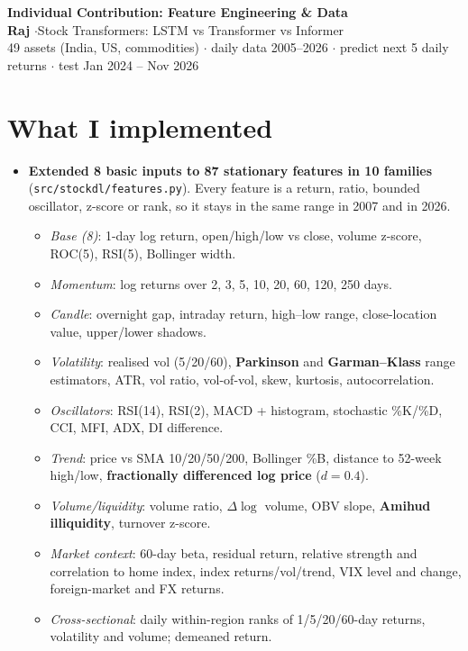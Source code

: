 \documentclass[10pt,a4paper]{article}
\begin{document}
\begin{center}
{\Large\bfseries Individual Contribution: Feature Engineering \& Data}\\[2pt]
\textbf{Raj} \quad$\cdot$\quad Stock Transformers: LSTM vs Transformer vs Informer\\[1pt]
\small 49 assets (India, US, commodities) $\cdot$ daily data 2005--2026 $\cdot$ predict next 5 daily returns $\cdot$ test Jan 2024 -- Nov 2026
\end{center}

\section{What I implemented}
\begin{itemize}
  \item \textbf{Extended 8 basic inputs to 87 stationary features in 10 families} (\texttt{src/stockdl/features.py}). Every feature is a return, ratio, bounded oscillator, z-score or rank, so it stays in the same range in 2007 and in 2026.
  \begin{itemize}
    \item \emph{Base (8)}: 1-day log return, open/high/low vs close, volume z-score, ROC(5), RSI(5), Bollinger width.
    \item \emph{Momentum}: log returns over 2, 3, 5, 10, 20, 60, 120, 250 days.
    \item \emph{Candle}: overnight gap, intraday return, high--low range, close-location value, upper/lower shadows.
    \item \emph{Volatility}: realised vol (5/20/60), \textbf{Parkinson} and \textbf{Garman--Klass} range estimators, ATR, vol ratio, vol-of-vol, skew, kurtosis, autocorrelation.
    \item \emph{Oscillators}: RSI(14), RSI(2), MACD + histogram, stochastic \%K/\%D, CCI, MFI, ADX, DI difference.
    \item \emph{Trend}: price vs SMA 10/20/50/200, Bollinger \%B, distance to 52-week high/low, \textbf{fractionally differenced log price} ($d=0.4$).
    \item \emph{Volume/liquidity}: volume ratio, $\Delta\log$ volume, OBV slope, \textbf{Amihud illiquidity}, turnover z-score.
    \item \emph{Market context}: 60-day beta, residual return, relative strength and correlation to home index, index returns/vol/trend, VIX level and change, foreign-market and FX returns.
    \item \emph{Cross-sectional}: daily within-region ranks of 1/5/20/60-day returns, volatility and volume; demeaned return.

\end{itemize}
\end{itemize}
\end{document}
